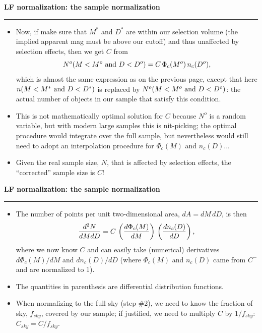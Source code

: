 \documentclass[letterpaper,landscape]{slides}
\begin{document}
\begin{slide}
\begin{center}
\bfseries
{\large {\color{red} LF normalization: the sample normalization}}
\end{center}
\hrule
\begin{itemize}
\item Now, if make sure that $M^\ast$ and $D^\ast$ are {\color{blue} within our selection volume} 
(the implied apparent mag must be above our cutoff)
and thus  {\color{blue} unaffected by selection effects,} then we get $C$ from
\begin{equation}
          N^o(M<M^o \,\, {\rm and} \,\,  D<D^o)= C \, \Phi_c(M^o) \, n_c(D^o),
\end{equation}
which is almost the same expression as on the previous page, except that here 
$n(M<M^\ast \,\, {\rm and} \,\,  D<D^\ast)$ is replaced by $N^o(M<M^o \,\, {\rm and} \,\,  D<D^o)$:
{\color{blue} the actual number of objects in our sample that satisfy this condition.}
\item This is not mathematically optimal solution for $C$ because  $N^o$ is a random variable, 
but with modern large samples this is nit-picking; the optimal procedure would integrate over the
full sample, but nevertheless would still need to adopt an interpolation procedure for 
$\Phi_c(M)$ and $n_c(D)$...
\item  {\color{blue} Given the real sample size, $N$, that is affected by selection effects,  the ``corrected'' sample
size is $C$!}
\end{itemize}
\vfill
\end{slide}
 

\begin{slide}
\begin{center}
\bfseries
{\large {\color{red} LF normalization: the sample normalization}}
\end{center}
\vskip 0.2in
\hrule
\begin{itemize} 
\item The number of points per unit two-dimensional area, $dA = dM \, dD$, is then
\begin{equation}
  {d^2 N \over dM dD } = C \, \left( {d \Phi_c(M) \over dM } \right) \, \left( {d n_c(D) \over d D} \right),
\end{equation}
where we now know $C$ and can easily take (numerical) derivatives  ${d \Phi_c(M) / dM }$ and
${d n_c(D) / d D}$ (where $\Phi_c(M)$ and $n_c(D)$ came from $C^-$ and are normalized to 1). 
\item The quantities in parenthesis are differential distribution functions.
\item  When normalizing to the full sky (step \#2), we need to know the fraction of sky, $f_{sky}$,
covered by our sample; if justified, we need to multiply $C$ by $1/f_{sky}$: $C_{sky} = C / f_{sky}$. 
\end{itemize}

\vfill
\end{slide}
 
\end{document}
